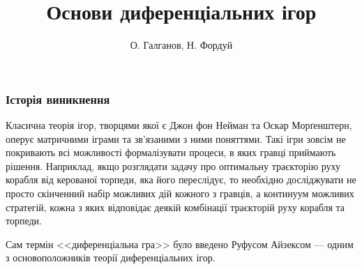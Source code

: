 \documentclass[10pt,pdf,aspectratio=169]{beamer}
\title{Основи диференціальних ігор}
\author{О. Галганов, Н. Фордуй}
\date{}
\begin{document}
    \begin{frame}
        \titlepage
    \end{frame}
    \begin{frame}
        \frametitle{Історія виникнення}
        Класична теорія ігор, творцями якої є Джон фон Нейман та Оскар Морґенштерн,
        оперує матричними іграми та зв'язаними з ними поняттями. Такі ігри зовсім не покривають всі можливості формалізувати процеси,
        в яких гравці приймають рішення. Наприклад, якщо розглядати задачу про оптимальну траєкторію руху
        корабля від керованої торпеди, яка його переслідує, то необхідно досліджувати не просто скінченний набір можливих дій
        кожного з гравців, а континуум можливих стратегій, кожна з яких відповідає деякій комбінації траєкторій руху корабля та торпеди.

        Сам термін <<диференціальна гра>> було введено Руфусом Айзексом --- одним з основоположників теорії диференціальних ігор.
    \end{frame}
\end{document}
